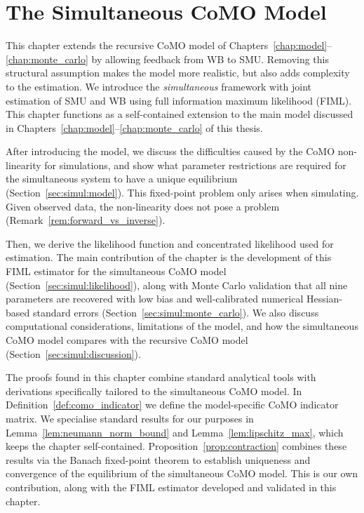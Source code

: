 
\chapter{The Simultaneous CoMO Model}
\label{chap:simultaneous}
This chapter extends the recursive CoMO model of Chapters~\ref{chap:model}--\ref{chap:monte_carlo} by allowing feedback from WB to SMU\@. Removing this structural assumption makes the model more realistic, but also adds complexity to the estimation. We introduce the \emph{simultaneous} framework with joint estimation of SMU and WB using full information maximum likelihood (FIML). This chapter functions as a self-contained extension to the main model discussed in Chapters~\ref{chap:model}--\ref{chap:monte_carlo} of this thesis.

After introducing the model, we discuss the difficulties caused by the CoMO non-linearity for simulations, and show what parameter restrictions are required for the simultaneous system to have a unique equilibrium (Section~\ref{sec:simul:model}). This fixed-point problem only arises when simulating. Given observed data, the non-linearity does not pose a problem (Remark~\ref{rem:forward_vs_inverse}).

Then, we derive the likelihood function and concentrated likelihood used for estimation. The main contribution of the chapter is the development of this FIML estimator for the simultaneous CoMO model (Section~\ref{sec:simul:likelihood}), along with Monte Carlo validation that all nine parameters are recovered with low bias and well-calibrated numerical Hessian-based standard errors (Section~\ref{sec:simul:monte_carlo}). We also discuss computational considerations, limitations of the model, and how the simultaneous CoMO model compares with the recursive CoMO model (Section~\ref{sec:simul:discussion}).

The proofs found in this chapter combine standard analytical tools with derivations specifically tailored to the simultaneous CoMO model. In Definition~\ref{def:como_indicator} we define the model-specific CoMO indicator matrix. We specialise standard results for our purposes in Lemma~\ref{lem:neumann_norm_bound} and Lemma~\ref{lem:lipschitz_max}, which keeps the chapter self-contained. Proposition~\ref{prop:contraction} combines these results via the Banach fixed-point theorem to establish uniqueness and convergence of the equilibrium of the simultaneous CoMO model. This is our own contribution, along with the FIML estimator developed and validated in this chapter.

